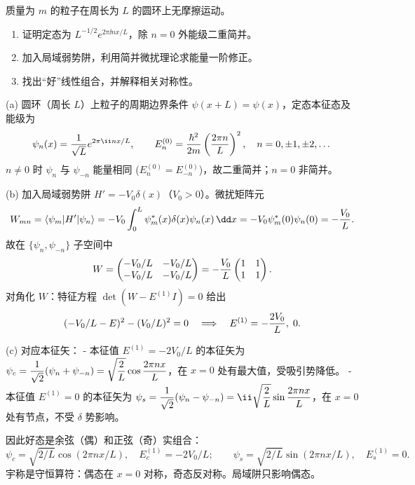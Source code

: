 \begin{question}
质量为 $m$ 的粒子在周长为 $L$ 的圆环上无摩擦运动。
\begin{enumerate}
\item 证明定态为 $L^{-1/2}e^{2\pi\ii nx/L}$，除 $n=0$ 外能级二重简并。
\item 加入局域弱势阱，利用简并微扰理论求能量一阶修正。
\item 找出“好”线性组合，并解释相关对称性。
\end{enumerate}
\end{question}
\begin{solution}
(a) 圆环（周长 $L$）上粒子的周期边界条件 $\psi(x+L)=\psi(x)$，定态本征态及能级为
\[
\psi_n(x)={1\over\sqrt L}e^{2\pi\ii nx/L},\qquad
E_n^{(0)}={\hbar^2\over2m}\left({2\pi n\over L}\right)^2,\quad n=0,\pm1,\pm2,\dots
\]
$n\ne0$ 时 $\psi_n$ 与 $\psi_{-n}$ 能量相同 ($E_n^{(0)}=E_{-n}^{(0)}$)，故二重简并；$n=0$ 非简并。

(b) 加入局域弱势阱 $H'=-V_0\delta(x)$（$V_0>0$）。微扰矩阵元
\[
W_{mn}=\langle\psi_m|H'|\psi_n\rangle
=-V_0\int_0^L\psi_m^*(x)\delta(x)\psi_n(x)\,\dd x
=-V_0\psi_m^*(0)\psi_n(0)=-{V_0\over L}.
\]
故在 $\{\psi_n,\psi_{-n}\}$ 子空间中
\[
W=\begin{pmatrix}
-V_0/L & -V_0/L\\
-V_0/L & -V_0/L
\end{pmatrix}
=-{V_0\over L}\begin{pmatrix}1&1\\1&1\end{pmatrix}.
\]
对角化 $W$：特征方程 $\det(W-E^{(1)}I)=0$ 给出
\[
(-V_0/L-E)^2-(V_0/L)^2=0
\quad\Longrightarrow\quad E^{(1)}=-{2V_0\over L},\;0.
\]

(c) 对应本征矢：
- 本征值 $E^{(1)}=-2V_0/L$ 的本征矢为 $\displaystyle\psi_c={1\over\sqrt2}(\psi_n+\psi_{-n})=\sqrt{2\over L}\cos{2\pi nx\over L}$，在 $x=0$ 处有最大值，受吸引势降低。
- 本征值 $E^{(1)}=0$ 的本征矢为 $\displaystyle\psi_s={1\over\sqrt2}(\psi_n-\psi_{-n})=\ii\sqrt{2\over L}\sin{2\pi nx\over L}$，在 $x=0$ 处有节点，不受 $\delta$ 势影响。

因此好态是余弦（偶）和正弦（奇）实组合：
\[
\boxed{\psi_c=\sqrt{2/L}\cos(2\pi nx/L),\quad E_c^{(1)}=-2V_0/L;}\qquad
\boxed{\psi_s=\sqrt{2/L}\sin(2\pi nx/L),\quad E_s^{(1)}=0.}
\]
宇称是守恒算符：偶态在 $x=0$ 对称，奇态反对称。局域阱只影响偶态。
\end{solution}

